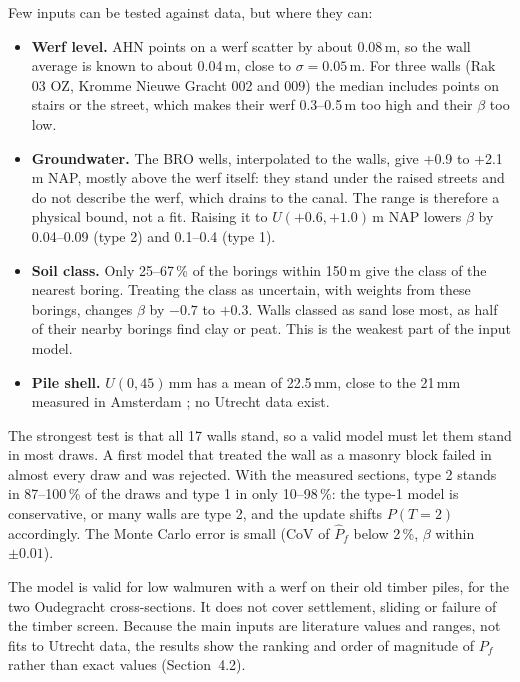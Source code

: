 Few inputs can be tested against data, but where they can:
\begin{itemize}\setlength{\itemsep}{0pt}\setlength{\parskip}{0pt}
  \item \textbf{Werf level.} AHN points on a werf scatter by about 0.08\,m,
    so the wall average is known to about 0.04\,m, close to $\sigma =
    0.05$\,m. For three walls (Rak 03 OZ, Kromme Nieuwe Gracht 002 and 009)
    the median includes points on stairs or the street, which makes their
    werf 0.3--0.5\,m too high and their $\beta$ too low.
  \item \textbf{Groundwater.} The BRO wells, interpolated to the walls, give
    +0.9 to +2.1\,m NAP, mostly above the werf itself: they stand under the
    raised streets and do not describe the werf, which drains to the canal.
    The range is therefore a physical bound, not a fit. Raising it to
    $U(+0.6, +1.0)$\,m NAP lowers $\beta$ by 0.04--0.09 (type 2) and 0.1--0.4
    (type 1).
  \item \textbf{Soil class.} Only 25--67\,\% of the borings within 150\,m
    give the class of the nearest boring. Treating the class as uncertain,
    with weights from these borings, changes $\beta$ by $-0.7$ to $+0.3$. Walls
    classed as sand lose most, as half of their nearby borings find clay or
    peat. This is the weakest part of the input model.
  \item \textbf{Pile shell.} $U(0, 45)$\,mm has a mean of 22.5\,mm, close to
    the 21\,mm measured in Amsterdam \cite{hemel2023}; no Utrecht data exist.
\end{itemize}

The strongest test is that all 17 walls stand, so a valid model must let
them stand in most draws. A first model that treated the wall as a masonry
block failed in almost every draw and was rejected. With the measured
sections, type 2 stands in 87--100\,\% of the draws and type 1 in only
10--98\,\%: the type-1 model is conservative, or many walls are type 2, and
the update shifts $P(T{=}2)$ accordingly. The Monte Carlo error is small
(CoV of $\hat P_f$ below 2\,\%, $\beta$ within $\pm 0.01$).

The model is valid for low walmuren with a werf on their old timber piles,
for the two Oudegracht cross-sections. It does not cover settlement, sliding
or failure of the timber screen. Because the main inputs are literature
values and ranges, not fits to Utrecht data, the results show the ranking and
order of magnitude of $P_f$ rather than exact values (Section~4.2).
